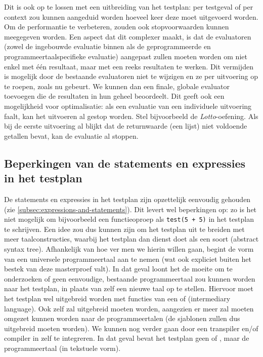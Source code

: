 Dit is ook op te lossen met een uitbreiding van het testplan: per testgeval of per context zou kunnen aangeduid worden hoeveel keer deze moet uitgevoerd worden.
Om de performantie te verbeteren, zouden ook stopvoorwaarden kunnen meegegeven worden.
Een aspect dat dit complexer maakt, is dat de evaluatoren (zowel de ingebouwde evaluatie binnen \tested{} als de geprogrammeerde en programmeertaalspecifieke evaluatie) aangepast zullen moeten worden om niet enkel met één resultaat, maar met een reeks resultaten te werken.
Dit vermijden is mogelijk door de bestaande evaluatoren niet te wijzigen en ze per uitvoering op te roepen, zoals nu gebeurt.
We kunnen dan een finale, globale evaluator toevoegen die de resultaten in hun geheel beoordeelt.
Dit geeft ook een mogelijkheid voor optimalisatie: als een evaluatie van een individuele uitvoering faalt, kan het uitvoeren al gestop worden.
Stel bijvoorbeeld de \emph{Lotto}-oefening.
Als bij de eerste uitvoering al blijkt dat de returnwaarde (een lijst) niet voldoende getallen bevat, kan de evaluatie al stoppen.

\subsection{Beperkingen van de statements en expressies in het testplan}\label{subsec:beperkte-expressies-in-het-testplan}

De statements en expressies in het testplan zijn opzettelijk eenvoudig gehouden (zie \cref{subsec:expressions-and-statements}).
Dit levert wel beperkingen op: zo is het niet mogelijk om bijvoorbeeld een functieoproep als \texttt{test(5 + 5)} in het testplan te schrijven.
Een idee zou dus kunnen zijn om het testplan uit te breiden met meer taalconstructies, waarbij het testplan dan dienst doet als een soort  (abstract syntax tree).
Afhankelijk van hoe ver men we hierin willen gaan, begint de vorm van een universele programmeertaal aan te nemen (wat ook expliciet buiten het bestek van deze masterproef valt).
In dat geval loont het de moeite om te onderzoeken of geen eenvoudige, bestaande programmeertaal  zou kunnen worden naar het testplan, in plaats van zelf een nieuwe taal op te stellen.
Hiervoor moet het testplan wel uitgebreid worden met functies van een  of  (intermediary language).
Ook \tested{} zelf zal uitgebreid moeten worden, aangezien er meer zal moeten omgezet kunnen worden naar de programmeertalen (de sjablonen zullen dus uitgebreid moeten worden).
We kunnen nog verder gaan door een transpiler en/of compiler in \tested{} zelf te integreren.
In dat geval bevat het testplan geen  of , maar de programmeertaal (in tekstuele vorm).

